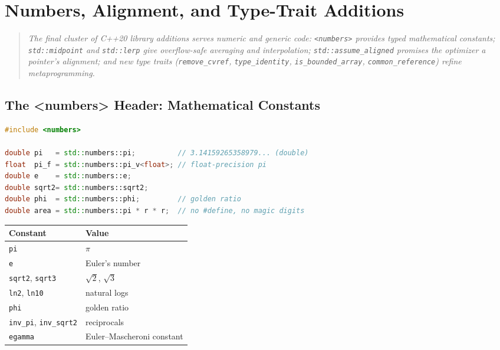\chapter{Numbers, Alignment, and Type-Trait Additions}
\label{ch:c20-numbers}

\begin{quote}
\emph{The final cluster of C++20 library additions serves numeric and generic code: \texttt{<numbers>} provides typed mathematical constants; \texttt{std::midpoint} and \texttt{std::lerp} give overflow-safe averaging and interpolation; \texttt{std::assume\_aligned} promises the optimizer a pointer's alignment; and new type traits (\texttt{remove\_cvref}, \texttt{type\_identity}, \texttt{is\_bounded\_array}, \texttt{common\_reference}) refine metaprogramming.}
\end{quote}

\section{The <numbers> Header: Mathematical Constants}
\label{sec:c20-numbers-header}

\begin{lstlisting}[language=C++,caption={Typed, full-precision mathematical constants}]
#include <numbers>

double pi   = std::numbers::pi;          // 3.14159265358979... (double)
float  pi_f = std::numbers::pi_v<float>; // float-precision pi
double e    = std::numbers::e;
double sqrt2= std::numbers::sqrt2;
double phi  = std::numbers::phi;         // golden ratio
double area = std::numbers::pi * r * r;  // no #define, no magic digits
\end{lstlisting}

\begin{center}
\begin{tabular}{ll}
\hline
\textbf{Constant} & \textbf{Value} \\
\hline
\texttt{pi} & $\pi$ \\
\texttt{e} & Euler's number \\
\texttt{sqrt2}, \texttt{sqrt3} & $\sqrt2$, $\sqrt3$ \\
\texttt{ln2}, \texttt{ln10} & natural logs \\
\texttt{phi} & golden ratio \\
\texttt{inv\_pi}, \texttt{inv\_sqrt2} & reciprocals \\
\texttt{egamma} & Euler--Mascheroni constant \\
\hline
\end{tabular}
\end{center}


